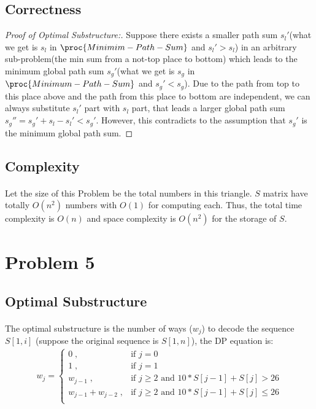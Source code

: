 \documentclass[]{article}
\begin{document}
        \subsection{Correctness}
        \begin{proof}[Proof of Optimal Substructure:]
        Suppose there exists a smaller path sum $s_l'$(what we get is $s_l$ in $\proc{Minimim-Path-Sum}$ and $s_l' > s_l$) in an arbitrary sub-problem(the min sum from a not-top place to bottom) which leads to the minimum global path sum $s_g'$(what we get is $s_g$ in $\proc{Minimum-Path-Sum}$ and $s_g' < s_g$). Due to the path from top to this place above and the path from this place to bottom are independent, we can always substitute $s_l'$ part with $s_l$ part, that leads a larger global path sum $s_g'' = s_g' + s_l - s_l' < s_g'$. However, this contradicts to the assumption that $s_g'$ is the minimum global path sum. 
        \end{proof}   
        \subsection{Complexity}
            \paragraph{}Let the size of this Problem be the total numbers in this triangle. $S$ matrix have totally $O(n^2)$ numbers with $O(1)$ for computing each. Thus, the total time complexity is $O(n)$ and space complexity is $O(n^2)$ for the storage of $S$.
            

    \section{Problem 5}
        \subsection{Optimal Substructure}
            \paragraph{}The optimal substructure is the number of ways ($w_j$) to decode the sequence $S[1, i]$ (suppose the original sequence is $S[1,n]$), the DP equation is:
            \begin{align*}
            w_j = \begin{cases}
                     0 \;,   & \text{if }j=0   \\
                     1 \;,   & \text{if }j=1   \\
                     w_{j-1} \;, & \text{if }j \geq 2 \text{ and } 10*S[j-1]+S[j] > 26 \\
                     w_{j-1} + w_{j-2} \;, & \text{if }j \geq 2 \text{ and } 10*S[j-1]+S[j] \leq 26 \\
                     \end{cases}
            \end{align*}
\end{document}
